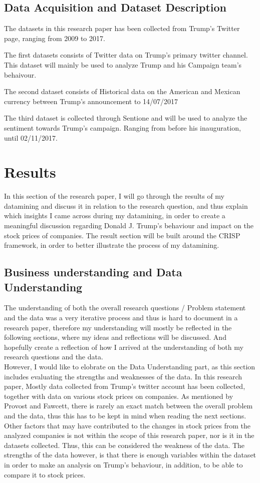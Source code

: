 \documentclass[11pt]{article}
\begin{document}
\subsection{Data Acquisition and Dataset Description}
The datasets in this research paper has been collected from Trump's Twitter page, ranging from 2009 to 2017.

The first datasets consists of Twitter data on Trump's primary twitter channel.  This dataset will mainly be used to analyze Trump and his Campaign team's behaivour. 

The second dataset consists of Historical data on the American and Mexican currency between Trump's announcement to  14/07/2017

The third dataset is collected through Sentione and will be used to analyze the sentiment towards Trump's campaign. Ranging from before his inauguration, until 02/11/2017. 


\section{Results}
In this section of the research paper, I will go through the results of my datamining and discuss it in relation to the research question, and thus explain which insights I came across during my datamining, in order to create a meaningful discussion regarding Donald J. Trump's behaviour and impact on the stock prices of companies. The result section will be built around the CRISP framework, in order to better illustrate the process of my datamining.

\subsection{Business understanding and Data Understanding}
The understanding of both the overall research questions / Problem statement and the data was a very iterative process and thus is hard to document in a research paper, therefore my understanding will mostly be reflected in the following sections, where my ideas and reflections will be discussed.  And hopefully create a reflection of how I arrived at the understanding of both my research questions and the data. \\

However, I would like to elobrate on the Data Understanding part, as this section includes evaluating the strengths and weaknesses of the data. In this research paper, Mostly data collected from Trump's twitter account has been collected, together with data on various stock prices on companies.  As mentioned by Provost and Fawcett, there is rarely an exact match between the overall problem and the data, thus this has to be kept in mind when reading the next sections. Other factors that may have contributed to the changes in stock prices from the analyzed companies is not within the scope of this research paper, nor is it in the datasets collected. Thus, this can be considered the weakness of the data. The strengths of the data however, is that there is enough variables within the dataset in order to make an analysis on Trump's behaviour, in addition, to be able to compare it to stock prices.
\end{document}

